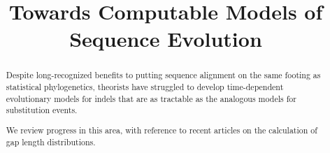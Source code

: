 \documentclass{bmcart}
\begin{document}
\begin{frontmatter}

\begin{fmbox}

\title{Towards Computable Models of Sequence Evolution}

\author[
   addressref={aff1},                   %
   corref={aff1},                       %
   email={ihh@berkeley.edu}   %
]{ }

\address[id=aff1]{%
  , %
  ,                              %
}


\end{fmbox}%

\begin{abstractbox}

\begin{abstract} %
Despite long-recognized benefits to putting sequence alignment on the same footing as statistical phylogenetics,
theorists have struggled to develop time-dependent evolutionary models for indels that are as tractable
as the analogous models for substitution events.

We review progress in this area, with reference to
recent articles on the calculation of gap length distributions.
\end{abstract}

\begin{keyword}
\end{keyword}


\end{abstractbox}
%

\end{frontmatter}
\end{document}
